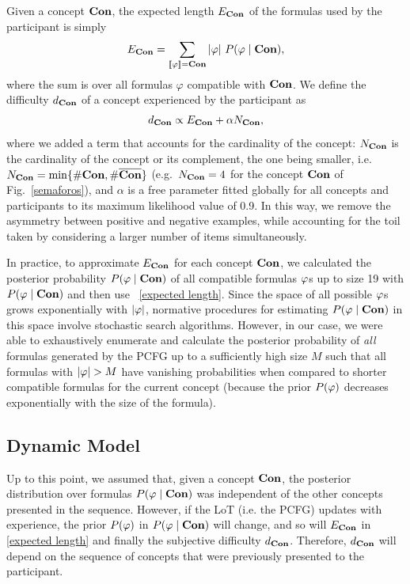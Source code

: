 Given a concept $\textbf{Con}$, the expected length $E_\textbf{Con}$ of the formulas used by the participant is simply
%
 \begin{equation}
E_\textbf{Con}=\sum_{\llbracket \varphi\rrbracket=\textbf{Con}} |\varphi| \ P(\varphi \mid \textbf{Con}),
 \label{expected length}
 \end{equation}
%
where the sum is over all formulas $\varphi$ compatible with $\textbf{Con}$. We  define the difficulty $d_\textbf{Con}$ of a concept experienced by the participant  as $$d_\textbf{Con} \propto E_\textbf{Con} + \alpha N_\textbf{Con},$$
%
%
where we added a term that accounts for the cardinality of the concept: $N_\textbf{Con}$ is the cardinality of the concept or its complement, the one being smaller, i.e.\ $N_\textbf{Con}=\min \{ \#\textbf{Con}, \#\overline {\textbf{Con}}\}$ (e.g.\ $N_\textbf{Con}=4$ for the concept $\textbf{Con}$ of  Fig.~\ref{semaforos}), and $\alpha$ is a free parameter fitted globally for all concepts and participants to its maximum likelihood value of 0.9. In this way, we remove the asymmetry between positive and negative examples, while accounting for the toil taken by considering a larger number of items simultaneously.

In practice, to approximate $E_\textbf{Con}$ for each concept $\textbf{Con}$, we calculated the posterior probability $P(\varphi\mid \textbf{Con})$ of all compatible formulas $\varphi$s up to size 19 with $P(\varphi\mid \textbf{Con})$ and then use ~\eqref{expected length}. Since the space of all possible $\varphi$s grows exponentially with $|\varphi|$, normative procedures for estimating $P(\varphi\mid \textbf{Con})$ in this space involve stochastic search algorithms. However, in our case, we were able to exhaustively enumerate and calculate the posterior probability of \textit{all} formulas generated by the PCFG up to a sufficiently high size $M$ such that all formulas with $|\form|>M$ have vanishing probabilities when compared to shorter compatible formulas for the current concept (because the prior $P(\varphi)$ decreases exponentially with the size of the formula).

\subsection{Dynamic Model}

Up to this point, we assumed that, given a concept $\textbf{Con}$, the posterior distribution over formulas $P(\varphi\mid \textbf{Con})$ was independent of the other concepts presented in the sequence. However, if the LoT (i.e. the PCFG) updates with experience, the prior $P(\varphi)$ in $P(\varphi\mid \textbf{Con})$ will change, and so will $E_\textbf{Con}$ in \eqref{expected length} and finally the subjective difficulty $d_\textbf{Con}$. Therefore, $d_\textbf{Con}$ will depend on the sequence of concepts that were previously presented to the participant.

